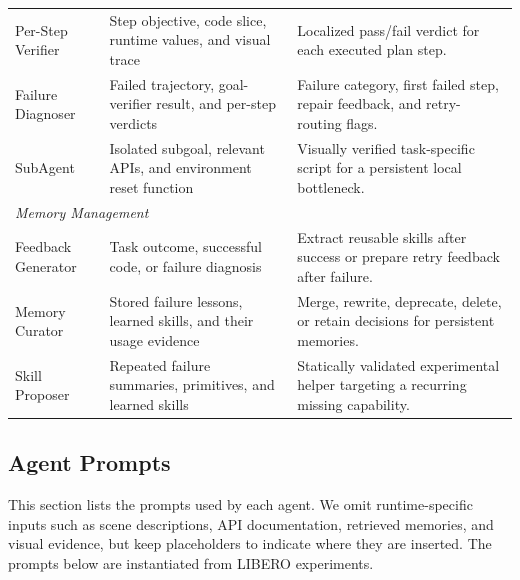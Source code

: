 \begin{table}[t]
\begin{tabular}{p{} p{} p{}}
Per-Step Verifier &
Step objective, code slice, runtime values, and visual trace &
Localized pass/fail verdict for each executed plan step. \\

Failure Diagnoser &
Failed trajectory, goal-verifier result, and per-step verdicts &
Failure category, first failed step, repair feedback, and retry-routing flags. \\

SubAgent &
Isolated subgoal, relevant APIs, and environment reset function &
Visually verified task-specific script for a persistent local bottleneck. \\

\midrule
\multicolumn{3}{l}{\textit{Memory Management}} \\
\midrule
Feedback Generator &
Task outcome, successful code, or failure diagnosis &
Extract reusable skills after success or prepare retry feedback after failure. \\

Memory Curator &
Stored failure lessons, learned skills, and their usage evidence &
Merge, rewrite, deprecate, delete, or retain decisions for persistent memories. \\

Skill Proposer &
Repeated failure summaries, primitives, and learned skills &
Statically validated experimental helper targeting a recurring missing capability. \\
\bottomrule
\end{tabular}
\end{table}

\subsection{Agent Prompts}
\label{sec:appendix_stable_prompt_templates}
This section lists the prompts used by each agent. 
We omit runtime-specific inputs such as scene descriptions, API documentation, retrieved memories, and visual evidence, but keep placeholders to indicate where they are inserted. 
The prompts below are instantiated from LIBERO experiments.

